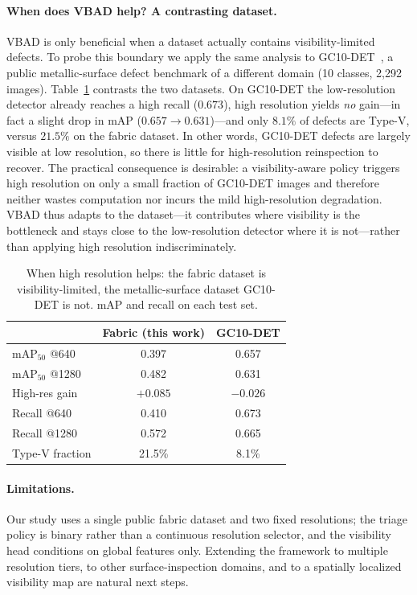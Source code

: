 \paragraph{When does VBAD help? A contrasting dataset.}
VBAD is only beneficial when a dataset actually contains visibility-limited
defects. To probe this boundary we apply the same analysis to GC10-DET~\cite{gc10det}, a public
metallic-surface defect benchmark of a different domain (10 classes, 2{,}292
images). Table~\ref{tab:gc10} contrasts the two datasets. On GC10-DET the
low-resolution detector already reaches a high recall ($0.673$), high resolution
yields \emph{no} gain---in fact a slight drop in mAP ($0.657 \to 0.631$)---and
only $8.1\%$ of defects are Type-V, versus $21.5\%$ on the fabric dataset. In
other words, GC10-DET defects are largely visible at low resolution, so there is
little for high-resolution reinspection to recover. The practical consequence is
desirable: a visibility-aware policy triggers high resolution on only a small
fraction of GC10-DET images and therefore neither wastes computation nor incurs
the mild high-resolution degradation. VBAD thus adapts to the dataset---it
contributes where visibility is the bottleneck and stays close to the
low-resolution detector where it is not---rather than applying high resolution
indiscriminately.

\begin{table}[t]
\centering
\caption{When high resolution helps: the fabric dataset is visibility-limited,
the metallic-surface dataset GC10-DET is not. mAP and recall on each test set.}
\label{tab:gc10}
\begin{tabular}{lcc}
\toprule
& Fabric (this work) & GC10-DET \\
\midrule
mAP$_{50}$ @640        & 0.397 & 0.657 \\
mAP$_{50}$ @1280       & 0.482 & 0.631 \\
High-res gain          & $+0.085$ & $-0.026$ \\
Recall @640            & 0.410 & 0.673 \\
Recall @1280           & 0.572 & 0.665 \\
Type-V fraction        & 21.5\% & 8.1\% \\
\bottomrule
\end{tabular}
\end{table}

\paragraph{Limitations.}
Our study uses a single public fabric dataset and two fixed resolutions; the
triage policy is binary rather than a continuous resolution selector, and the
visibility head conditions on global features only. Extending the framework to
multiple resolution tiers, to other surface-inspection domains, and to a
spatially localized visibility map are natural next steps.
